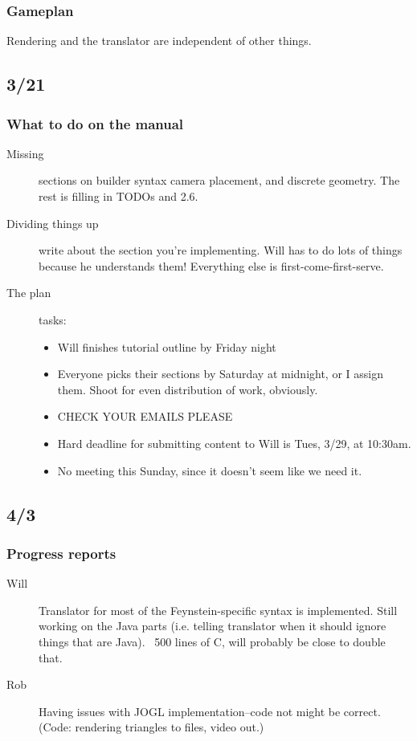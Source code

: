 \subsubsection*{Gameplan}
Rendering and the translator are independent of other things.

\subsection*{3/21}

\subsubsection*{What to do on the manual}
\begin{description}
\item[Missing] sections on builder syntax camera placement, and
  discrete geometry. The rest is filling in TODOs and 2.6.
\item[Dividing things up] write about the section you're
  implementing. Will has to do lots of things because he understands
  them! Everything else is first-come-first-serve.
\item[The plan] tasks:
  \begin{itemize}
  \item Will finishes tutorial outline by Friday night
  \item Everyone picks their sections by Saturday at midnight, or I
    assign them. Shoot for even distribution of work, obviously.
  \item CHECK YOUR EMAILS PLEASE
  \item Hard deadline for submitting content to Will is Tues, 3/29, at 10:30am.
  \item No meeting this Sunday, since it doesn't seem like we need it.
  \end{itemize}
\end{description}

\subsection*{4/3}

\subsubsection*{Progress reports}
\begin{description}
\item[Will] Translator for most of the Feynstein-specific syntax is
  implemented. Still working on the Java parts (i.e. telling
  translator when it should ignore things that are Java). ~500 lines
  of C, will probably be close to double that.

\item[Rob] Having issues with JOGL implementation--code not might be
  correct. (Code: rendering triangles to files, video out.)
\end{description}

